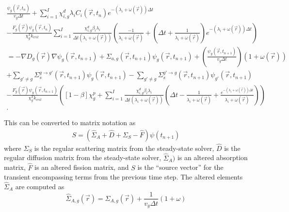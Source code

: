 \documentclass[12pt]{report}
\begin{document}
	\begin{eqnarray}
	\frac{\psi_g(\vec{r},t_{n})}{v_g \Delta t} +  \sum_{i=1}^{I} \chi_{i,g}^d \lambda_i C_i(\vec{r},t_{n}) e^{-\left(\lambda_i + \omega(\vec{r})\right) \Delta t} \nonumber \\
	-  \frac{F_g(\vec{r}) \psi_g(\vec{r},t_{n})}{\chi_g^T k_{crit}}  \sum_{i=1}^{I} \frac{\chi_{i,g}^d \beta_i \lambda_i}{\Delta t \left( \lambda_i + \omega(\vec{r}) \right)} \left( \frac{-1}{\lambda_i + \omega(\vec{r})} + \left(\Delta t + \frac{1}{\lambda_i + \omega(\vec{r})} \right)e^{-\left(\lambda_i + \omega(\vec{r}) \right) \Delta t} \right) \nonumber \\
	  = - \nabla D_g(\vec{r}) \nabla \psi_g(\vec{r},t_{n+1}) + \Sigma_{a,g}(\vec{r},t_{n+1}) \psi_g(\vec{r},t_{n+1}) + \left(\frac{\psi_g(\vec{r},t_{n+1})}{v_g \Delta t} \right) \left( 1 + \omega(\vec{r}) \right) \nonumber \\ + \sum_{g'\neq g} \Sigma_{s}^{g\rightarrow g'} (\vec{r},t_{n+1}) \psi_g(\vec{r},t_{n+1}) - \sum_{g' \neq g} \Sigma_{s}^{g'\rightarrow g} (\vec{r},t_{n+1}) \psi_{g'}(\vec{r},t_{n+1}) \nonumber \\
	- \frac{F_g(\vec{r}) \psi_g(\vec{r},t_{n+1})}{\chi_g^T k_{crit}} \left(\left[ 1- \beta \right] \chi_g^p + \sum_{i=1}^{I} \frac{\chi_{i,g}^d \beta_i \lambda_i}{\Delta t \left( \lambda_i + \omega(\vec{r}) \right)} \left( \Delta t - \frac{1}{\lambda_i + \omega(\vec{r})} + \frac{e^{-\left( \lambda_i + \omega(\vec{r}) \right) \Delta t}}{\lambda_i + \omega(\vec{r})}\right) \right) \nonumber \\ 
	\nonumber.
	\end{eqnarray}
	
	This can be converted to matrix notation as
	\begin{eqnarray}
	S = \left( \hat{\Sigma}_A +  \hat{D} + \Sigma_S - \hat{F} \right) \psi(t_{n+1})
	\end{eqnarray}
	where $\Sigma_S$ is the regular scattering matrix from the steady-state solver, $\hat{D}$ is the regular diffusion matrix from the steady-state solver, $\hat{\Sigma}_A)$ is an altered absorption matrix, $\hat{F}$ is an altered fission matrix, and $S$ is the ``source vector'' for the transient  encompassing terms from the previous time step. The altered elements $\hat{\Sigma}_A$ are computed as
	\begin{equation}
	\hat{\Sigma}_{A,g}(\vec{r}) = \Sigma_{A,g}(\vec{r}) + \frac{1}{v_g \Delta t} \left( 1 + \omega \right)
	\end{equation}
	
\end{document}
